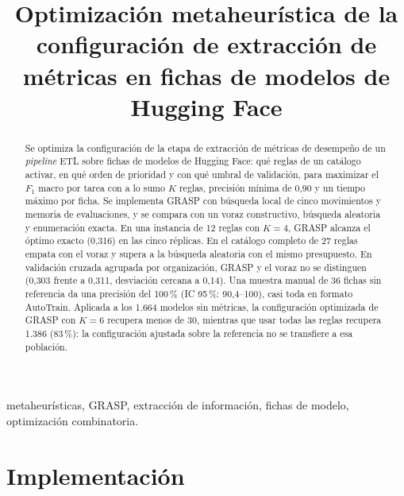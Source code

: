 \documentclass[conference]{IEEEtran}
\begin{document}
	
	\title{Optimizaci\'on metaheur\'istica de la configuraci\'on de extracci\'on de m\'etricas en fichas de modelos de Hugging Face}
	
	\author{
		}
	
	\maketitle
	
	\begin{abstract}
		Se optimiza la configuraci\'on de la etapa de extracci\'on de m\'etricas de desempe\~no de un \emph{pipeline} ETL sobre fichas de modelos de Hugging Face: qu\'e reglas de un cat\'alogo activar, en qu\'e orden de prioridad y con qu\'e umbral de validaci\'on, para maximizar el $F_1$ macro por tarea con a lo sumo $K$ reglas, precisi\'on m\'inima de 0,90 y un tiempo m\'aximo por ficha. Se implementa GRASP con b\'usqueda local de cinco movimientos y memoria de evaluaciones, y se compara con un voraz constructivo, b\'usqueda aleatoria y enumeraci\'on exacta. En una instancia de 12 reglas con $K=4$, GRASP alcanza el \'optimo exacto (0,316) en las cinco r\'eplicas. En el cat\'alogo completo de 27 reglas empata con el voraz y supera a la b\'usqueda aleatoria con el mismo presupuesto. En validaci\'on cruzada agrupada por organizaci\'on, GRASP y el voraz no se distinguen (0,303 frente a 0,311, desviaci\'on cercana a 0,14). Una muestra manual de 36 fichas sin referencia da una precisi\'on del 100\,\% (IC 95\,\%: 90,4--100), casi toda en formato AutoTrain. Aplicada a los 1.664 modelos sin m\'etricas, la configuraci\'on optimizada de GRASP con $K=6$ recupera menos de 30, mientras que usar todas las reglas recupera 1.386 (83\,\%): la configuraci\'on ajustada sobre la referencia no se transfiere a esa poblaci\'on.
	\end{abstract}
	
	\begin{IEEEkeywords}
		metaheur\'isticas, GRASP, extracci\'on de informaci\'on, fichas de modelo, optimizaci\'on combinatoria.
	\end{IEEEkeywords}
	
	\section{Implementaci\'on}
	
\end{document}
